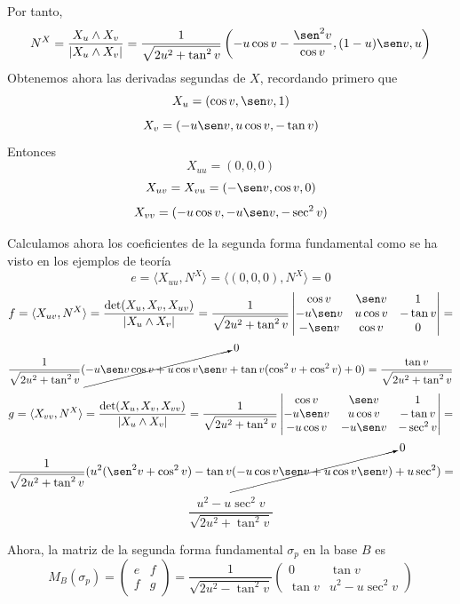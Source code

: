 \documentclass[12pt]{article}
\newcommand{\prodesc}[2]{\langle #1, #2 \rangle}
\begin{document}
\begin{ejercicio}
\begin{enumerate}
            Por tanto, $$N^X = \dfrac{X_u \land X_v}{|X_u \land X_v|} = 
            \dfrac{1}{\sqrt{2u^2 + \tan^2v}} \left(-u \cos v - \dfrac{\sen^2 v}{\cos v}, (1-u) \sen v, u \right)$$
            Obtenemos ahora las derivadas segundas de $X$, recordando primero que
            $$X_u = (\cos v, \sen v, 1)$$
            $$X_v = (-u \sen v, u \cos v, -\tan v)$$
            Entonces
            $$X_{uu} = (0,0,0)$$
            $$X_{uv} = X_{vu} = (-\sen v, \cos v, 0)$$
            $$X_{vv} = (-u \cos v, - u \sen v, -\sec^2 v)$$

            Calculamos ahora los coeficientes de la segunda forma fundamental como se ha visto en los ejemplos de teoría
            $$e = \prodesc{X_{uu}}{N^X} = \prodesc{(0,0,0)}{N^X} = 0$$
            $$f = \prodesc{X_{uv}}{N^X} = \dfrac{\det(X_u, X_v, X_{uv})}{|X_u \land X_v|} = 
            \dfrac{1}{\sqrt{2u^2 + \tan^2 v}} \begin{vmatrix}
                \cos v & \sen v & 1 \\
                - u \sen v & u \cos v & - \tan v \\
                - \sen v & \cos v & 0
            \end{vmatrix} = $$
            $$\dfrac{1}{\sqrt{2u^2 + \tan^2 v}} (\cancelto{0}{-u \sen v \cos v + u \cos v \sen v} + \tan v (\cos^2 v + \cos^2 v) + 0) = 
            \dfrac{\tan v}{\sqrt{2u^2 + \tan^2 v}}$$
            $$g = \prodesc{X_{vv}}{N^X} = \dfrac{\det(X_u, X_v, X_{vv})}{|X_u \land X_v|} = 
            \dfrac{1}{\sqrt{2u^2 + \tan^2 v}} \begin{vmatrix}
                \cos v & \sen v & 1 \\
                - u \sen v & u \cos v & - \tan v \\
                - u \cos v & - u \sen v & -\sec^2 v
            \end{vmatrix} = $$
            $$\dfrac{1}{\sqrt{2u^2 + \tan^2 v}} (u^2(\sen^2 v + \cos^2 v) - \tan v\cancelto{0}{(-u \cos v \sen v + u \cos v \sen v)} + 
            u \sec^2) = $$
            $$\dfrac{u^2 - u \sec^2 v}{\sqrt{2u^2 + \tan^2 v}}$$

            Ahora, la matriz de la segunda forma fundamental $\sigma_p$ en la base $B$ es
            $$\boxed{M_B(\sigma_p) = \begin{pmatrix}
                e & f \\
                f & g
            \end{pmatrix} = \dfrac{1}{\sqrt{2u^2 - \tan^2v}} \begin{pmatrix}
                0 & \tan v \\
                \tan v & u^2 - u \sec^2v
            \end{pmatrix}}$$


\end{enumerate}
\end{ejercicio}
\end{document}
